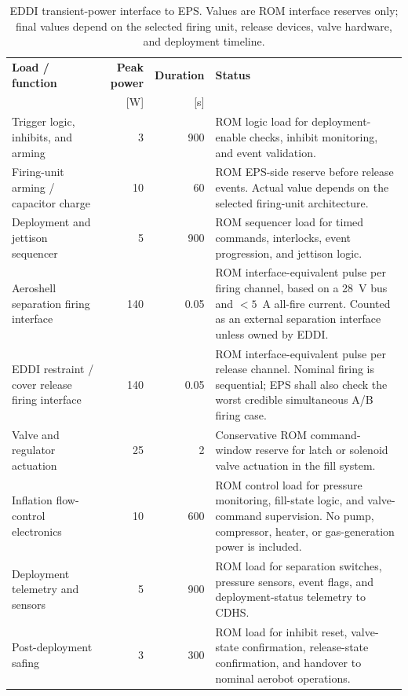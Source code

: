 \begin{table}[H]
\centering
\renewcommand{\arraystretch}{1}
\small
\caption{EDDI transient-power interface to EPS. Values are ROM interface reserves only; final values depend on the selected firing unit, release devices, valve hardware, and deployment timeline.}
\label{tab:eddi-power-transient}
\begin{tabularx}{\textwidth}{p{3.5cm} r r X@{}}
\toprule
\textbf{Load / function} & \textbf{Peak power} & \textbf{Duration} & \textbf{Status} \\
 & [W] & [s] & \\
\midrule
Trigger logic, inhibits, and arming
& 3
& 900
& ROM logic load for deployment-enable checks, inhibit monitoring, and event validation. \\

Firing-unit arming / capacitor charge
& 10
& 60
& ROM EPS-side reserve before release events. Actual value depends on the selected firing-unit architecture. \\

Deployment and jettison sequencer
& 5
& 900
& ROM sequencer load for timed commands, interlocks, event progression, and jettison logic. \\

Aeroshell separation firing interface
& 140
& 0.05
& ROM interface-equivalent pulse per firing channel, based on a 28~V bus and $<5$~A all-fire current. Counted as an external separation interface unless owned by EDDI. \\

EDDI restraint / cover release firing interface
& 140
& 0.05
& ROM interface-equivalent pulse per release channel. Nominal firing is sequential; EPS shall also check the worst credible simultaneous A/B firing case. \\

Valve and regulator actuation
& 25
& 2
& Conservative ROM command-window reserve for latch or solenoid valve actuation in the fill system. \\

Inflation flow-control electronics
& 10
& 600
& ROM control load for pressure monitoring, fill-state logic, and valve-command supervision. No pump, compressor, heater, or gas-generation power is included. \\

Deployment telemetry and sensors
& 5
& 900
& ROM load for separation switches, pressure sensors, event flags, and deployment-status telemetry to CDHS. \\

Post-deployment safing
& 3
& 300
& ROM load for inhibit reset, valve-state confirmation, release-state confirmation, and handover to nominal aerobot operations. \\
\bottomrule
\end{tabularx}
\end{table}

